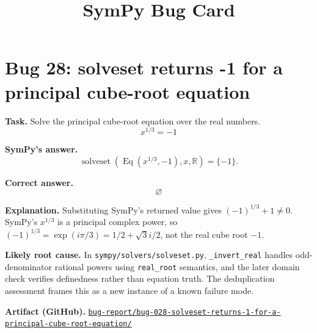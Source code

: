 \documentclass[11pt]{article}
\title{SymPy Bug Card}
\author{}
\date{}
\newcommand{\artifactrepo}{https://github.com/TODO-org/TODO-repo}
\newcommand{\bugbundle}[1]{\href{\artifactrepo/tree/main/bug-report/#1}{\nolinkurl{bug-report/#1/}}}
\begin{document}
\maketitle

\section*{Bug 28: solveset returns -1 for a principal cube-root equation}

\begin{counterexamplebox}
\textbf{Task.} Solve the principal cube-root equation over the real numbers.
\[
x^{1/3}=-1
\]

\medskip
\textbf{SymPy's answer.}
\[
\operatorname{solveset}(\operatorname{Eq}(x^{1/3},-1),x,\mathbb{R})=\{-1\}.
\]

\medskip
\textbf{Correct answer.}
\[
\varnothing
\]

\medskip
\textbf{Explanation.} Substituting SymPy's returned value gives
\((-1)^{1/3}+1\ne0\).  SymPy's \(x^{1/3}\) is a principal complex power, so
\((-1)^{1/3}=\exp(i\pi/3)=1/2+\sqrt{3}i/2\), not the real cube root \(-1\).

\medskip
\textbf{Likely root cause.} In \nolinkurl{sympy/solvers/solveset.py},
\texttt{\_invert\_real} handles odd-denominator rational powers using
\texttt{real\_root} semantics, and the later domain check verifies definedness
rather than equation truth.  The deduplication assessment frames this as a new
instance of a known failure mode.

\medskip
\textbf{Artifact (GitHub).} \bugbundle{bug-028-solveset-returns-1-for-a-principal-cube-root-equation}
\end{counterexamplebox}
\end{document}
